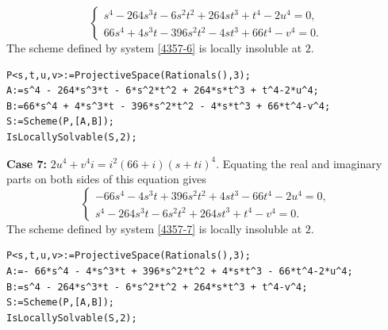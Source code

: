 \documentclass[a4paper,12pt,english,reqno]{amsart}
\begin{document}
\begin{equation}\label{4357-6}
\begin{cases}
s^4 - 264s^3t - 6s^2t^2 + 264st^3 + t^4 - 2u^4=0,\\
66s^4 + 4s^3t - 396s^2t^2 - 4st^3 + 66t^4 - v^4=0.
\end{cases}
\end{equation}
The scheme defined by system \eqref{4357-6} is locally insoluble at $2$.

\begin{lstlisting}
P<s,t,u,v>:=ProjectiveSpace(Rationals(),3);
A:=s^4 - 264*s^3*t - 6*s^2*t^2 + 264*s*t^3 + t^4-2*u^4;
B:=66*s^4 + 4*s^3*t - 396*s^2*t^2 - 4*s*t^3 + 66*t^4-v^4;
S:=Scheme(P,[A,B]);
IsLocallySolvable(S,2);
\end{lstlisting}

{\bf Case 7:} $2u^4+v^4i=i^2(66+i)(s+ti)^4$. Equating the real and imaginary parts on both sides of this equation gives
\begin{equation}\label{4357-7}
\begin{cases}
-66s^4 - 4s^3t + 396s^2t^2 + 4st^3 - 66t^4 - 2u^4=0,\\
s^4 - 264s^3t - 6s^2t^2 + 264st^3 + t^4 - v^4=0.
\end{cases}
\end{equation}
The scheme defined by system \eqref{4357-7} is locally insoluble at $2$.

\begin{lstlisting}
P<s,t,u,v>:=ProjectiveSpace(Rationals(),3);
A:=- 66*s^4 - 4*s^3*t + 396*s^2*t^2 + 4*s*t^3 - 66*t^4-2*u^4;
B:=s^4 - 264*s^3*t - 6*s^2*t^2 + 264*s*t^3 + t^4-v^4;
S:=Scheme(P,[A,B]);
IsLocallySolvable(S,2);
\end{lstlisting}
\end{document}

